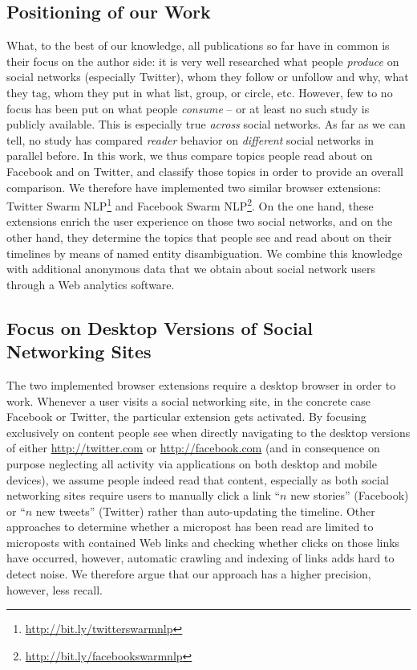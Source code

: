 \documentclass{iosart2c}
\begin{document}
\subsection{Positioning of our Work}
What, to the best of our knowledge, all publications so far have in common is their focus on the author side: it is very well researched what people \emph{produce} on social networks (especially Twitter), whom they follow or unfollow and why, what they tag, whom they put in what list, group, or circle, etc.
However, few to no focus has been put on what people \emph{consume} -- or at least no such study is publicly available.
This is especially true \emph{across} social networks.
As far as we can tell, no study has compared \emph{reader} behavior on \emph{different} social networks in parallel before.
In this work, we thus compare topics people read about on Facebook and on Twitter, and classify those topics in order to provide an overall comparison. 
We therefore have implemented two similar browser extensions: Twitter Swarm NLP\footnote{\url{http://bit.ly/twitterswarmnlp}} and Facebook Swarm NLP\footnote{\url{http://bit.ly/facebookswarmnlp}}. 
On the one hand, these extensions enrich the user experience on those two social networks, and on the other hand, they determine the topics that people see and read about on their timelines by means of named entity disambiguation.
We combine this knowledge with additional anonymous data that we obtain about social network users through a Web analytics software.

\subsection{Focus on Desktop Versions of Social Networking Sites}
The two implemented browser extensions require a desktop browser in order to work.
Whenever a user visits a social networking site, in the concrete case Facebook or Twitter, the particular extension gets activated.
By focusing exclusively on content people see when directly navigating to the desktop versions of either \url{http://twitter.com} or \url{http://facebook.com} (and in consequence on purpose neglecting all activity via applications on both desktop and mobile devices), we assume people indeed read that content, especially as both social networking sites require users to manually click a link ``$\mathit{n}$ new stories'' (Facebook) or ``$\mathit{n}$ new tweets'' (Twitter) rather than auto-updating the timeline.
Other approaches to determine whether a micropost has been read are limited to microposts with contained Web links and checking whether clicks on those links have occurred, however, automatic crawling and indexing of links adds hard to detect noise.
We therefore argue that our approach has a higher precision, however, less recall.
\end{document}
